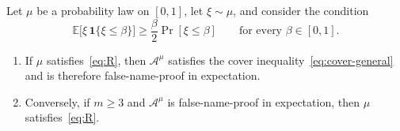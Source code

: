 \documentclass[format=acmsmall, review=false]{acmart}
\newcommand{\E}{\mathbb{E}}
\theoremstyle{acmdefinition}%
\begin{document}
\begin{proposition}
\label{prop:reserve}
Let \(\mu\) be a probability law on \([0,1]\), let \(\xi\sim\mu\),
and consider the condition
\begin{equation*}\label{eq:R}
\tag{R}
\E\bigl[\xi\,\mathbf{1}\{\xi\le\beta\}\bigr]
\ge\frac{\beta}{2}\Pr[\xi\le\beta]
\qquad\text{for every }\beta\in[0,1].
\end{equation*}
\begin{enumerate}
\item[(a)] If \(\mu\) satisfies~\eqref{eq:R}, then
\(\mathcal A^{\mu}\) satisfies the cover
inequality~\eqref{eq:cover-general} and is therefore
false-name-proof in expectation.
\item[(b)] Conversely, if \(m\ge3\) and \(\mathcal A^{\mu}\) is
false-name-proof in expectation, then \(\mu\)
satisfies~\eqref{eq:R}.
\end{enumerate}
\end{proposition}
\end{document}
